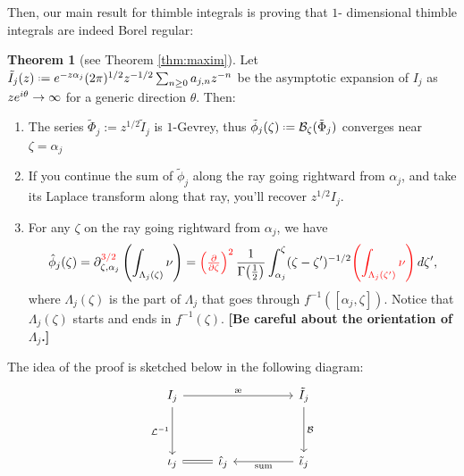 \documentclass{article}
\let\Re\relax
\DeclareMathOperator{\Re}{Re}
\theoremstyle{definition}
\newcommand{\fracderiv}[3]{\partial^{#1}_{#2, #3}}
\newcommand*{\defeq}{\mathrel{\vcenter{\baselineskip0.5ex \lineskiplimit0pt
                     \hbox{\scriptsize.}\hbox{\scriptsize.}}}%
                     =}
\newcommand{\laplace}{\mathcal{L}}
\newcommand{\borel}{\mathcal{B}}
\newcommand{\aexp}{\text{\ae}}
\newtheorem{theorem}{Theorem}[section]
\begin{document}

Then, our main result for thimble integrals is proving that $1$- dimensional thimble integrals are indeed Borel regular:

\begin{theorem}[see Theorem \ref{thm:maxim}]
    Let $\tilde{I}_{j}(z)\defeq e^{-z \alpha_j}(2\pi)^{1/2} z^{-1/2} \sum_{n\geq 0}a_{j,n}z^{-n}$ be the asymptotic expansion of $I_j$ as $\Re z e^{i\theta}\to \infty$ for a generic direction $\theta$. Then:
\begin{enumerate}
\item The series $\tilde{\Phi}_j:=z^{1/2} \tilde{I}_j$ is $1$-Gevrey, thus $\tilde{\phi}_j(\zeta)\defeq\borel_\zeta(\tilde{\Phi}_j)$ converges near $\zeta=\alpha_j$
\item If you continue the sum of $\tilde{\phi}_j$ along the ray going rightward from $\alpha_j$, and take its Laplace transform along that ray, you'll recover $z^{1/2} I_j$.
\item For any $\zeta$ on the ray going rightward from $\alpha_j$, we have
\begin{multline}
\hat{\phi}_{j}(\zeta)=\fracderiv{\textcolor{red}{3/2}}{\zeta}{\alpha_j} \left( \int_{\Lambda_j(\zeta)}\nu \right)=\textcolor{red}{\left(\tfrac{\partial}{\partial \zeta}\right)^2}\,\frac{1}{\Gamma\big(\tfrac{1}{2}\big)} \int_{\alpha_j}^\zeta (\zeta-\zeta')^{-1/2} \textcolor{red}{\left( \int_{\Lambda_j(\zeta')} \nu \right)}\,d\zeta',
\end{multline}
where $\Lambda_j(\zeta)$ is the part of $\Lambda_j$ that goes through $f^{-1}([\alpha_j, \zeta])$. Notice that $\Lambda_j(\zeta)$ starts and ends in $f^{-1}(\zeta)$. \textbf{[Be careful about the orientation of $\Lambda_j$.]}
\end{enumerate}
\end{theorem}

The idea of the proof is sketched below in the following diagram:
\[
\begin{tikzcd}
{I}_{j} \arrow[rrr,"\aexp"]\arrow[dd, swap,"\laplace^{-1} "] &  & & \tilde{I}_{j}\arrow[dd,"\borel"]\\
& & &\\
\iota_j \arrow[r,equal] & \hat{\iota}_j & &\tilde{\iota}_{j} \arrow[ll, "\text{sum}"]
\end{tikzcd}
\]
\end{document}
